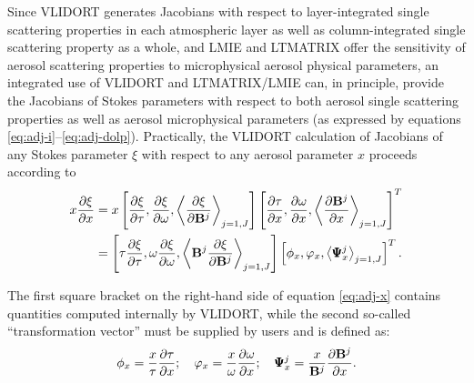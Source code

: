 Since VLIDORT generates Jacobians with respect to layer-integrated
single scattering properties in each atmospheric layer as well as
column-integrated single scattering property as a whole, and LMIE and
LTMATRIX offer the sensitivity of aerosol scattering properties to
microphysical aerosol physical parameters, an integrated use of VLIDORT
and LTMATRIX/LMIE can, in principle, provide the Jacobians of Stokes
parameters with respect to both aerosol single scattering properties as
well as aerosol microphysical parameters (as expressed by equations
\eqref{eq:adj-i}--\eqref{eq:adj-dolp}). Practically, the VLIDORT
calculation of Jacobians of any Stokes parameter $\xi$ with respect to 
any aerosol parameter $x$ proceeds according to
\begin{equation}
\begin{split}
x\frac{\partial\xi}{\partial x} &=
  x\left[ \frac{\partial\xi}{\partial\tau}, \frac{\partial\xi}{\partial\omega}, 
          \left< \frac{\partial\xi}{\partial\mathbf{B}^j}\right>_{j=1,J}\right] 
  \left[ \frac{\partial\tau}{\partial x}, \frac{\partial\omega}{\partial x}, 
         \left< \frac{\partial\mathbf{B}^j}{\partial x}\right>_{j=1,J}\right]^T \\
  &= \left[ \tau \frac{\partial\xi}{\partial\tau}, \omega \frac{\partial\xi}{\partial\omega}, 
          \left< \mathbf{B}^j \frac{\partial\xi}{\partial\mathbf{B}^j}\right>_{j=1,J}\right]
     \left[ \phi_x, \varphi_x, \left< \pmb{\Psi}_x^j\right>_{j=1,J}
\right]^T. 
\end{split}
\label{eq:adj-x}
\end{equation}

The first square bracket on the right-hand side of equation
\eqref{eq:adj-x} contains quantities computed internally by VLIDORT, 
while the second so-called “transformation vector” must be supplied 
by users and is defined as:
\begin{equation}
\phi_x = \frac{x}{\tau}\frac{\partial\tau}{\partial x}; \quad 
\varphi_x = \frac{x}{\omega}\frac{\partial\omega}{\partial x}; \quad 
\pmb{\Psi}_x^j = \frac{x}{\mathbf{B}^j}\frac{\partial\mathbf{B}^j}{\partial x}.
\label{eq:lopt}
\end{equation}

